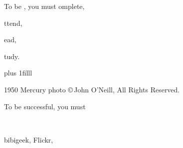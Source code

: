 \documentclass[t]{beamer}
\begin{document}
{

\begin{frame}[t]{To be , you must}
\vspace{1ex}
\hspace{22em}omplete,

\vspace{1ex}
\hspace{22em}ttend,

\vspace{1ex}
\hspace{22em}ead,

\vspace{1ex}
\hspace{22em}tudy.

\vskip 0pt plus 1filll

\tiny 1950 Mercury photo \copyright\,John O'Neill, All Rights Reserved.
\end{frame}
}
%
{
\begin{frame}[b,plain]{To be successful, you must }
\textcolor{white}{\tiny Daniel Foster, Flickr, }
\end{frame}
}



{
\begin{frame}[b]{\textcolor{white}{We do stupid stuff in college because\dots}}
\end{frame}
}



{
\begin{frame}[b]
\hfill	\tiny bibigeek, Flickr, 
\end{frame}
}


{
\begin{frame}
\end{frame}
}

{
\begin{frame}[t,plain]
\end{frame}
}
\end{document}
